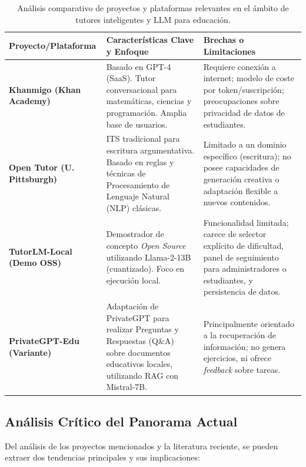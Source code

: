 \begin{table}[H]
\centering
\begin{tabular}{@{}p{3.5cm}p{6.5cm}p{3.5cm}@{}}
\toprule
\textbf{Proyecto/Plataforma} & \textbf{Características Clave y Enfoque} & \textbf{Brechas o Limitaciones}\\
\midrule
\textbf{Khanmigo (Khan Academy)} & Basado en GPT-4 (SaaS). Tutor conversacional para matemáticas, ciencias y programación. Amplia base de usuarios. & Requiere conexión a internet; modelo de coste por token/suscripción; preocupaciones sobre privacidad de datos de estudiantes. \\
\textbf{Open Tutor (U. Pittsburgh)} & ITS tradicional para escritura argumentativa. Basado en reglas y técnicas de Procesamiento de Lenguaje Natural (NLP) clásicas. & Limitado a un dominio específico (escritura); no posee capacidades de generación creativa o adaptación flexible a nuevos contenidos. \\
\textbf{TutorLM-Local (Demo OSS)} & Demostrador de concepto \emph{Open Source} utilizando Llama-2-13B (cuantizado). Foco en ejecución local. & Funcionalidad limitada; carece de selector explícito de dificultad, panel de seguimiento para administradores o estudiantes, y persistencia de datos. \\
\textbf{PrivateGPT-Edu (Variante)} & Adaptación de PrivateGPT para realizar Preguntas y Respuestas (Q\&A) sobre documentos educativos locales, utilizando RAG con Mistral-7B. & Principalmente orientado a la recuperación de información; no genera ejercicios, ni ofrece \emph{feedback} sobre tareas. \\
\bottomrule
\end{tabular}
\caption{Análisis comparativo de proyectos y plataformas relevantes en el ámbito de tutores inteligentes y LLM para educación.}
\label{tab:related-work}
\end{table}

\subsection{Análisis Crítico del Panorama Actual}
\label{ssec:analisis_critico_panorama}

Del análisis de los proyectos mencionados y la literatura reciente, se pueden extraer dos tendencias principales y sus implicaciones:

